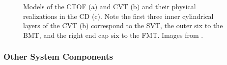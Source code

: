         \begin{figure}[H]
            \centering
            \hfill
            \hfill
            \caption[Central Detector Packages]{Models of the CTOF (a) and CVT (b) and their physical realizations in the CD (c). Note the first three inner cylindrical layers of the CVT (b) correspond to the SVT, the outer six to the BMT, and the right end cap six to the FMT. Images from \parencite{Burkert2020TheLaboratory}.}
            \label{fig:your_labels}
        \end{figure}
     
        

\subsubsection*{Other System Components}

